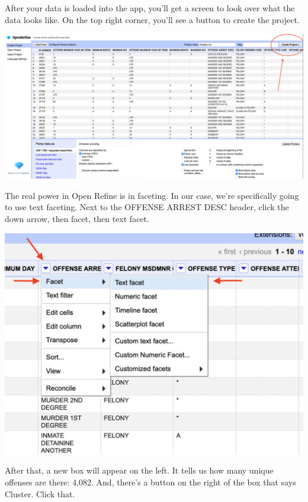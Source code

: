 \documentclass[]{book}
\begin{document}
After your data is loaded into the app, you'll get a screen to look over what the data looks like. On the top right corner, you'll see a button to create the project.

\includegraphics[width=46.64in]{images/open2}

The real power in Open Refine is in faceting. In our case, we're specifically going to use text faceting. Next to the OFFENSE ARREST DESC header, click the down arrow, then facet, then text facet.

\includegraphics[width=14.67in]{images/open3}

After that, a new box will appear on the left. It tells us how many unique offenses are there: 4,082. And, there's a button on the right of the box that says Cluster. Click that.
\end{document}
